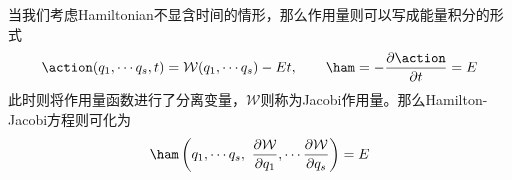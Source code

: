 当我们考虑Hamiltonian不显含时间的情形，那么作用量则可以写成能量积分的形式
\begin{equation}
    \action (q_1,\cdots q_s,t) = \mathcal{W}(q_1,\cdots q_s)-Et,\qquad \ham = - \frac{\partial\action}{\partial t} = E
\end{equation}
此时则将作用量函数进行了分离变量，$\mathcal{W}$则称为Jacobi作用量。那么Hamilton-Jacobi方程则可化为
\begin{equation}
    \ham\left(q_1,\cdots q_s,~\frac{\partial\mathcal{{W}}}{\partial q_1},\cdots \frac{\partial\mathcal{{W}}}{\partial q_s} \right) = E
\end{equation}
